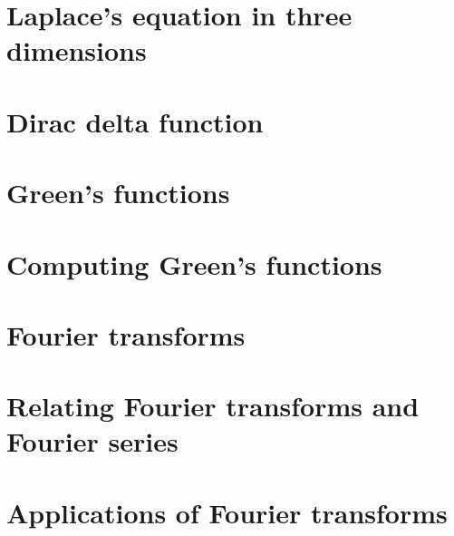 \documentclass{article}
\begin{document}
\section{Laplace's equation in three dimensions}

\section{Dirac delta function}

\section{Green's functions}

\section{Computing Green's functions}

\section{Fourier transforms}

\section{Relating Fourier transforms and Fourier series}

\section{Applications of Fourier transforms}

\end{document}
